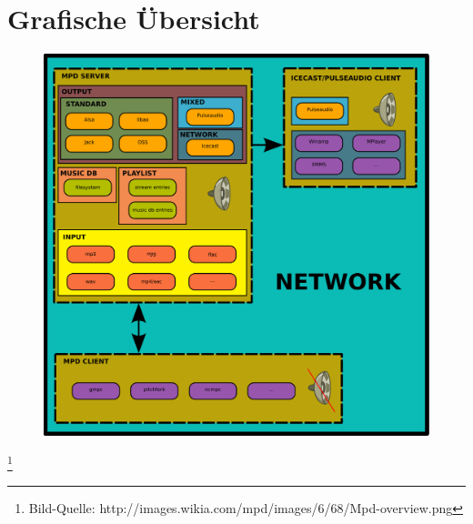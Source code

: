 \section{Grafische Übersicht}
\begin{figure}[h]
\centering
\includegraphics[scale=0.6]{Mpd-overview.png}
\end{figure}
\footnote{Bild-Quelle: http://images.wikia.com/mpd/images/6/68/Mpd-overview.png}

